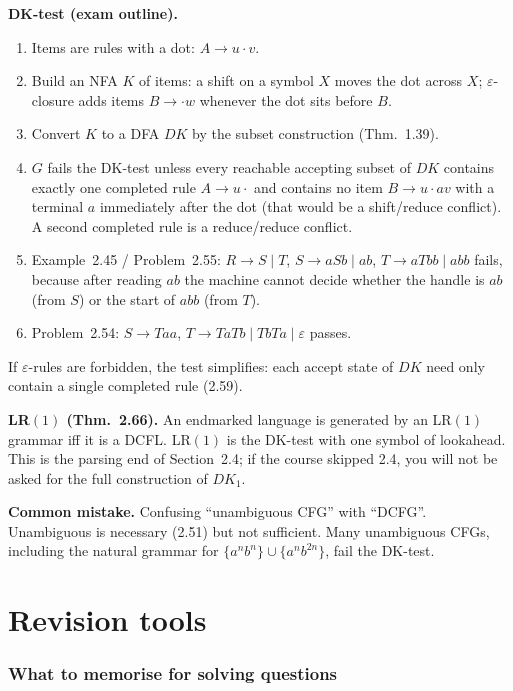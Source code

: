 \documentclass[11pt,a4paper]{article}
\newcommand{\eps}{\varepsilon}
\begin{document}
\textbf{DK-test (exam outline).}
\begin{enumerate}
  \item Items are rules with a dot: $A\to u{\cdot}v$.
  \item Build an NFA $K$ of items: a shift on a symbol $X$ moves
        the dot across $X$; $\eps$-closure adds items
        $B\to{\cdot}w$ whenever the dot sits before $B$.
  \item Convert $K$ to a DFA $DK$ by the subset construction
        (Thm.~1.39).
  \item $G$ fails the DK-test unless every reachable accepting
        subset of $DK$ contains exactly one completed rule
        $A\to u{\cdot}$ and contains no item
        $B\to u{\cdot}av$ with a terminal $a$ immediately after
        the dot (that would be a shift/reduce conflict). A
        second completed rule is a reduce/reduce conflict.
  \item Example~2.45 / Problem~2.55: $R\to S\mid T$,
        $S\to aSb\mid ab$, $T\to aTbb\mid abb$ fails, because
        after reading $ab$ the machine cannot decide whether the
        handle is $ab$ (from $S$) or the start of $abb$ (from
        $T$).
  \item Problem~2.54: $S\to Taa$,
        $T\to TaTb\mid TbTa\mid\eps$ passes.
\end{enumerate}

If $\eps$-rules are forbidden, the test simplifies: each accept
state of $DK$ need only contain a single completed rule (2.59).

\textbf{LR$(1)$ (Thm.~2.66).}
An endmarked language is generated by an LR$(1)$ grammar iff it
is a DCFL. LR$(1)$ is the DK-test with one symbol of lookahead.
This is the parsing end of Section~2.4; if the course skipped
2.4, you will not be asked for the full construction of $DK_1$.

\textbf{Common mistake.}
Confusing ``unambiguous CFG'' with ``DCFG''. Unambiguous is
necessary (2.51) but not sufficient. Many unambiguous CFGs,
including the natural grammar for
$\{a^nb^n\}\cup\{a^nb^{2n}\}$, fail the DK-test.

\part{Revision tools}

\section{What to memorise for solving questions}
\label{sec:checklist}
\end{document}
